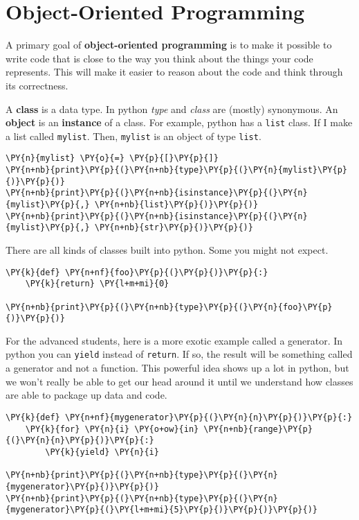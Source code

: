 \chapter{Object-Oriented Programming}


A primary goal of \textbf{object-oriented programming} is to make it possible to write code that is close to the way you think about the things your code represents.
This will make it easier to reason about the code and think through its correctness.


A \textbf{class} is a data type.  In python \emph{type} and \emph{class} are (mostly) synonymous.  An \textbf{object} is an \textbf{instance} of a class.  For example, python has a \texttt{list} class.  If I make a list called \texttt{mylist}.  Then, \texttt{mylist} is an object of type \texttt{list}.  

\begin{Verbatim}[commandchars=\\\{\}]
\PY{n}{mylist} \PY{o}{=} \PY{p}{[}\PY{p}{]}
\PY{n+nb}{print}\PY{p}{(}\PY{n+nb}{type}\PY{p}{(}\PY{n}{mylist}\PY{p}{)}\PY{p}{)}
\PY{n+nb}{print}\PY{p}{(}\PY{n+nb}{isinstance}\PY{p}{(}\PY{n}{mylist}\PY{p}{,} \PY{n+nb}{list}\PY{p}{)}\PY{p}{)}
\PY{n+nb}{print}\PY{p}{(}\PY{n+nb}{isinstance}\PY{p}{(}\PY{n}{mylist}\PY{p}{,} \PY{n+nb}{str}\PY{p}{)}\PY{p}{)}
\end{Verbatim}



There are all kinds of classes built into python.  Some you might not expect.

\begin{Verbatim}[commandchars=\\\{\}]
\PY{k}{def} \PY{n+nf}{foo}\PY{p}{(}\PY{p}{)}\PY{p}{:}
    \PY{k}{return} \PY{l+m+mi}{0}

\PY{n+nb}{print}\PY{p}{(}\PY{n+nb}{type}\PY{p}{(}\PY{n}{foo}\PY{p}{)}\PY{p}{)}
\end{Verbatim}



For the advanced students, here is a more exotic example called a generator.  In python you can \texttt{yield} instead of \texttt{return}.  If so, the result will be something called a generator and not a function.  This powerful idea shows up a lot in python, but we won't really be able to get our head around it until we understand how classes are able to package up data and code.  

\begin{Verbatim}[commandchars=\\\{\}]
\PY{k}{def} \PY{n+nf}{mygenerator}\PY{p}{(}\PY{n}{n}\PY{p}{)}\PY{p}{:}
    \PY{k}{for} \PY{n}{i} \PY{o+ow}{in} \PY{n+nb}{range}\PY{p}{(}\PY{n}{n}\PY{p}{)}\PY{p}{:}
        \PY{k}{yield} \PY{n}{i}

\PY{n+nb}{print}\PY{p}{(}\PY{n+nb}{type}\PY{p}{(}\PY{n}{mygenerator}\PY{p}{)}\PY{p}{)}
\PY{n+nb}{print}\PY{p}{(}\PY{n+nb}{type}\PY{p}{(}\PY{n}{mygenerator}\PY{p}{(}\PY{l+m+mi}{5}\PY{p}{)}\PY{p}{)}\PY{p}{)}
\end{Verbatim}


